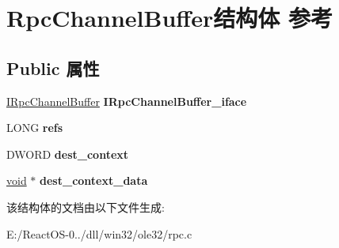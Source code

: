 \hypertarget{struct_rpc_channel_buffer}{}\section{Rpc\+Channel\+Buffer结构体 参考}
\label{struct_rpc_channel_buffer}
\subsection*{Public 属性}
\begin{DoxyCompactItemize}
\item 
\mbox{\label{struct_rpc_channel_buffer_a1ed61eb422b66f246bcd199719a76d1e}} 
\hyperlink{interface_i_rpc_channel_buffer}{I\+Rpc\+Channel\+Buffer} {\bfseries I\+Rpc\+Channel\+Buffer\+\_\+iface}
\item 
\mbox{\label{struct_rpc_channel_buffer_a699f00febf05c3f5c6805df275a7a0ef}} 
L\+O\+NG {\bfseries refs}
\item 
\mbox{\label{struct_rpc_channel_buffer_a0637a376bff721720ba0293159f2e6fe}} 
D\+W\+O\+RD {\bfseries dest\+\_\+context}
\item 
\mbox{\label{struct_rpc_channel_buffer_a1b8efd07305b9c883c723b6d5c196938}} 
\hyperlink{interfacevoid}{void} $\ast$ {\bfseries dest\+\_\+context\+\_\+data}
\end{DoxyCompactItemize}


该结构体的文档由以下文件生成\+:\begin{DoxyCompactItemize}
\item 
E\+:/\+React\+O\+S-\/0../dll/win32/ole32/rpc.\+c\end{DoxyCompactItemize}
